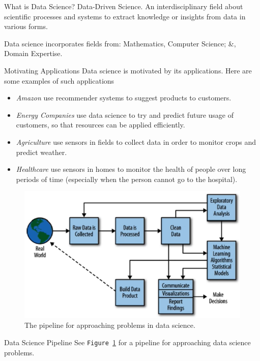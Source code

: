 \documentclass[11pt,a4paper]{article}
\begin{document}
  \begin{remark}{What is Data Science?}
    Data-Driven Science. An interdisciplinary field about scientific processes and systems to extract knowledge or insights from data in various forms.
    \par Data science incorporates fields from: Mathematics, Computer Science; \&, Domain Expertise.
  \end{remark}

  \begin{remark}{Motivating Applications}
    Data science is motivated by its applications. Here are some examples of such applications
    \begin{itemize}
      \item \textit{Amazon} use recommender systems to suggest products to customers.
      \item \textit{Energy Companies} use data science to try and predict future usage of customers, so that resources can be applied efficiently.
      \item \textit{Agriculture} use sensors in fields to collect data in order to monitor crops and predict weather.
      \item \textit{Healthcare} use sensors in homes to monitor the health of people over long periods of time (especially when the person cannot go to the hospital).
    \end{itemize}
  \end{remark}

  \begin{figure}[H]
    \centering
    \includegraphics[width=.7\textwidth]{DataSciencePipeline.PNG}
    \caption{The pipeline for approaching problems in data science.}
    \label{fig_DataSciencePipeline}
  \end{figure}

  \begin{proposition}{Data Science Pipeline}
    See \texttt{Figure \ref{fig_DataSciencePipeline}} for a pipeline for approaching data science problems.
  \end{proposition}
\end{document}
